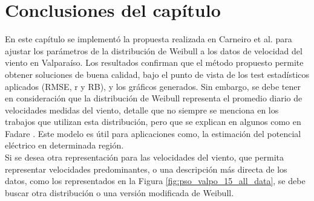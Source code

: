 \newpage
\section{Conclusiones del capítulo}
En este capítulo se implementó la propuesta realizada en Carneiro et al. \cite{Carneiro15} para ajustar los parámetros de la distribución de Weibull a los datos de velocidad del viento en Valparaíso. Los resultados confirman que el método propuesto permite obtener soluciones de buena calidad, bajo el punto de vista de los test estadísticos aplicados (RMSE, r y RB), y los gráficos generados. Sin embargo, se debe tener en consideración que la distribución de Weibull representa el promedio diario de velocidades medidas del viento, detalle que no siempre se menciona en los trabajos que utilizan esta distribución, pero que se explican en algunos como en Fadare \cite{Fadare08}. Este modelo es útil para aplicaciones como, la estimación del potencial eléctrico en determinada región.\\
Si se desea otra representación para las velocidades del viento, que permita representar velocidades predominantes, o una descripción más directa de los datos, como los representados en la Figura \ref{fig:pso_valpo_15_all_data}, se debe buscar otra distribución o una versión modificada de Weibull.